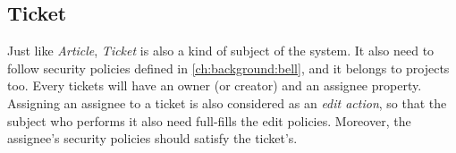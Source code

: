 
\subsection{Ticket}
\label{ch:hopot_project:ticket}

Just like \emph{Article}, \emph{Ticket} is also a kind of subject of the system.
It also need to follow security policies defined in \autoref{ch:background:bell}, and it belongs to projects too.
Every tickets will have an owner (or creator) and an assignee property.
Assigning an assignee to a ticket is also considered as an \emph{edit action}, so that the subject who performs it also need full-fills the edit policies.
Moreover, the assignee's security policies should satisfy the ticket's.
